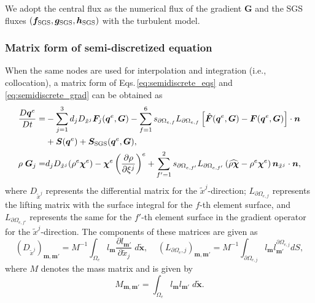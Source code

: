 We adopt the central flux  
as the numerical flux of the gradient $\bm{G}$ and 
the SGS fluxes $(\bm{f}_{\rm SGS},\bm{g}_{\rm SGS},\bm{h}_{\rm SGS})$ 
with the turbulent model. 


\subsubsection{Matrix form of semi-discretized equation}
When the same nodes are used for interpolation and integration (i.e., collocation), 
a matrix form of Eqs.\,\eqref{eq:semidiscrete_eqs} and \eqref{eq:semidiscrete_grad} can be obtained as   
\begin{align}
    \dfrac{D \bm{q}^e}{Dt} 
    =&
      - \sum_{j=1}^{3} d_j D_{\tilde{x}^j} \bm{F}_j  (\bm{q}^e,\bm{G})
      - \sum_{f=1}^{6} s_{\partial \Omega_{e,f}} L_{\partial \Omega_{e,f}} \left[ \hat{\bm{F}} (\bm{q}^e,\bm{G}) 
                 - \bm{F}  (\bm{q}^e,\bm{G}) \right] 
               \cdot \bm{n} \nonumber \\
      &+ \bm{S} (\bm{q}^e) + \bm{S}_{\rm SGS} (\bm{q}^e,\bm{G}), 
\label{eq:semidiscrete_eqs_matform} 
\\
  \rho \; \bm{G}_j
  =&
  d_j D_{\tilde{x}^j} (\rho^e \bm{\chi}^e) 
    - \bm{\chi}^e  \left(\dfrac{\partial \rho}{\partial \xi^j}\right)^e
  + \sum_{f'=1}^2 s_{\partial \Omega_{e,f'}} L_{\partial \Omega_{e,f'}} \left( \widehat{\rho\bm{\chi}} - \rho^e \bm{\chi}^e \right)\bm{n}_{\tilde{x}^j}  \cdot \bm{n}, 
\label{eq:semidiscrete_eqs_aux_matform}
\end{align}
where 
$D_{\tilde{x}^j}$ represents the differential matrix for the $\tilde{x}^j$-direction; 
$L_{\partial \Omega_{e,f}}$ represents the lifting matrix with the surface integral for the $f$-th element surface, 
and $L_{\partial \Omega_{e,f'}}$ represents the same for the $f'$-th element surface in the gradient operator for the $\tilde{x}^j$-direction. 
The components of these matrices are given as 
\begin{equation}
 \left( D_{\tilde{x}^j} \right)_{\bm{m},\bm{m}'} 
 = M^{-1} \int_{\Omega_e}  l_{\bm{m}} \dfrac{\partial l_{\bm{m}'}}{\partial \tilde{x}_j}  \; d\tilde{\bm{x}}, 
 \;\;\;\;
 \left( L_{\partial \Omega_e,j} \right)_{\bm{m},{\bm{m}'}} 
 = M^{-1} \int_{\partial \Omega_{e,j}}  l_{\bm{m}} l^{\partial \Omega_{e,j}}_{\bm{m}'} dS, 
\label{eq:differential_and_lifting_matrix}
\end{equation}
where $M$ denotes the mass matrix and is given by
\begin{equation}
 M_{\bm{m},\bm{m}'} 
  = \int_{\Omega_e}  l_{\bm{m}} l_{\bm{m}'}  \; d\tilde{\bm{x}}.
\label{eq:mass_matrix}
\end{equation}
